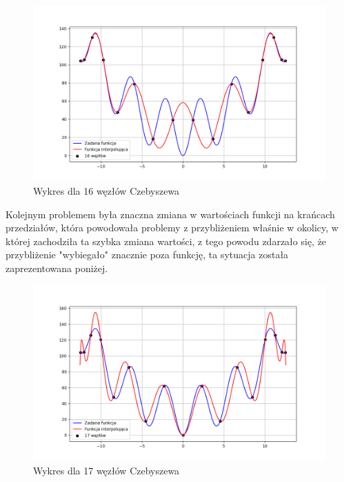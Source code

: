 \documentclass{article}
\begin{document}
\begin{figure}[H]
\centering
  \begin{minipage}[b]{0.49\textwidth}
    \includegraphics[width=\textwidth]{img02__n=16.png}
    \caption{Wykres dla 16 węzłów Czebyszewa}
  \end{minipage}
\end{figure}

\newpage

Kolejnym problemem była znaczna zmiana w wartościach funkcji na krańcach przedziałów, która powodowała problemy z przybliżeniem właśnie w okolicy, w której zachodziła ta szybka zmiana wartości, z tego powodu zdarzało się, że przybliżenie "wybiegało" znacznie poza funkcję, ta sytuacja została zaprezentowana poniżej.

\begin{figure}[H]
\centering
  \begin{minipage}[b]{0.49\textwidth}
    \includegraphics[width=\textwidth]{img02__n=17.png}
    \caption{Wykres dla 17 węzłów Czebyszewa}
  \end{minipage}
\end{figure}
\end{document}
